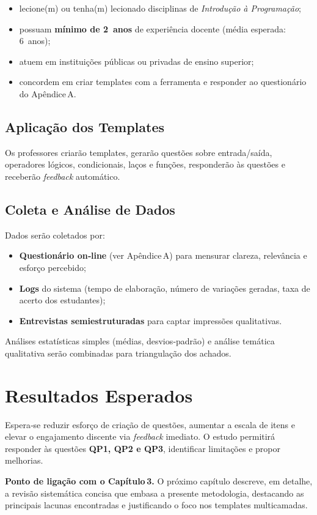 \begin{itemize}
    \item lecione(m) ou tenha(m) lecionado disciplinas de \textit{Introdução à Programação};
    \item possuam \textbf{mínimo de 2 anos} de experiência docente (média esperada: 6 anos);
    \item atuem em instituições públicas ou privadas de ensino superior;
    \item concordem em criar templates com a ferramenta e responder ao questionário do Apêndice A.
\end{itemize}

\subsection{Aplicação dos Templates}
Os professores criarão templates, gerarão questões sobre entrada/saída, operadores lógicos, condicionais, laços e funções, responderão às questões e receberão \textit{feedback} automático.

\subsection{Coleta e Análise de Dados}
Dados serão coletados por:

\begin{itemize}
    \item \textbf{Questionário on‑line} (ver Apêndice A) para mensurar clareza, relevância e esforço percebido;
    \item \textbf{Logs} do sistema (tempo de elaboração, número de variações geradas, taxa de acerto dos estudantes);
    \item \textbf{Entrevistas semiestruturadas} para captar impressões qualitativas.
\end{itemize}

Análises estatísticas simples (médias, desvios‑padrão) e análise temática qualitativa serão combinadas para triangulação dos achados.

\section{Resultados Esperados}

Espera‑se reduzir esforço de criação de questões, aumentar a escala de itens e elevar o engajamento discente via \textit{feedback} imediato. O estudo permitirá responder às questões \textbf{QP1, QP2 e QP3}, identificar limitações e propor melhorias.

\bigskip
\noindent
\textbf{Ponto de ligação com o Capítulo 3.}  
O próximo capítulo descreve, em detalhe, a revisão sistemática concisa que embasa a presente metodologia, destacando as principais lacunas encontradas e justificando o foco nos templates multicamadas.
